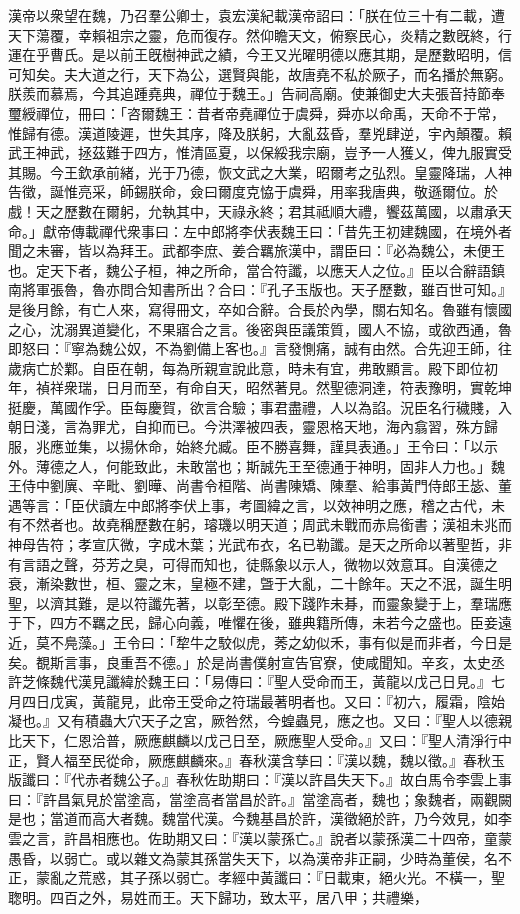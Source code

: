 \begin{pinyinscope}
漢帝以衆望在魏，乃召羣公卿士，袁宏漢紀載漢帝詔曰：「朕在位三十有二載，遭天下蕩覆，幸賴祖宗之靈，危而復存。然仰瞻天文，俯察民心，炎精之數旣終，行運在乎曹氏。是以前王旣樹神武之績，今王又光曜明德以應其期，是歷數昭明，信可知矣。夫大道之行，天下為公，選賢與能，故唐堯不私於厥子，而名播於無窮。朕羨而慕焉，今其追踵堯典，禪位于魏王。」告祠高廟。使兼御史大夫張音持節奉璽綬禪位，冊曰：「咨爾魏王：昔者帝堯禪位于虞舜，舜亦以命禹，天命不于常，惟歸有德。漢道陵遲，世失其序，降及朕躬，大亂茲昏，羣兇肆逆，宇內顛覆。賴武王神武，拯茲難于四方，惟清區夏，以保綏我宗廟，豈予一人獲乂，俾九服實受其賜。今王欽承前緒，光于乃德，恢文武之大業，昭爾考之弘烈。皇靈降瑞，人神告徵，誕惟亮采，師錫朕命，僉曰爾度克恊于虞舜，用率我唐典，敬遜爾位。於戲！天之歷數在爾躬，允執其中，天祿永終；君其祗順大禮，饗茲萬國，以肅承天命。」獻帝傳載禪代衆事曰：左中郎將李伏表魏王曰：「昔先王初建魏國，在境外者聞之未審，皆以為拜王。武都李庶、姜合羈旅漢中，謂臣曰：『必為魏公，未便王也。定天下者，魏公子桓，神之所命，當合符讖，以應天人之位。』臣以合辭語鎮南將軍張魯，魯亦問合知書所出？合曰：『孔子玉版也。天子歷數，雖百世可知。』是後月餘，有亡人來，寫得冊文，卒如合辭。合長於內學，關右知名。魯雖有懷國之心，沈溺異道變化，不果寤合之言。後密與臣議策質，國人不協，或欲西通，魯即怒曰：『寧為魏公奴，不為劉備上客也。』言發惻痛，誠有由然。合先迎王師，往歲病亡於鄴。自臣在朝，每為所親宣說此意，時未有宜，弗敢顯言。殿下即位初年，禎祥衆瑞，日月而至，有命自天，昭然著見。然聖德洞達，符表豫明，實乾坤挺慶，萬國作孚。臣每慶賀，欲言合驗；事君盡禮，人以為諂。況臣名行穢賤，入朝日淺，言為罪尤，自抑而已。今洪澤被四表，靈恩格天地，海內翕習，殊方歸服，兆應並集，以揚休命，始終允臧。臣不勝喜舞，謹具表通。」王令曰：「以示外。薄德之人，何能致此，未敢當也；斯誠先王至德通于神明，固非人力也。」魏王侍中劉廙、辛毗、劉曄、尚書令桓階、尚書陳矯、陳羣、給事黃門侍郎王毖、董遇等言：「臣伏讀左中郎將李伏上事，考圖緯之言，以效神明之應，稽之古代，未有不然者也。故堯稱歷數在躬，璿璣以明天道；周武未戰而赤烏銜書；漢祖未兆而神母告符；孝宣庂微，字成木葉；光武布衣，名已勒讖。是天之所命以著聖哲，非有言語之聲，芬芳之臭，可得而知也，徒縣象以示人，微物以效意耳。自漢德之衰，漸染數世，桓、靈之末，皇極不建，曁于大亂，二十餘年。天之不泯，誕生明聖，以濟其難，是以符讖先著，以彰至德。殿下踐阼未朞，而靈象變于上，羣瑞應于下，四方不羈之民，歸心向義，唯懼在後，雖典籍所傳，未若今之盛也。臣妾遠近，莫不鳧藻。」王令曰：「犂牛之駮似虎，莠之幼似禾，事有似是而非者，今日是矣。覩斯言事，良重吾不德。」於是尚書僕射宣告官寮，使咸聞知。辛亥，太史丞許芝條魏代漢見讖緯於魏王曰：「易傳曰：『聖人受命而王，黃龍以戊己日見。』七月四日戊寅，黃龍見，此帝王受命之符瑞最著明者也。又曰：『初六，履霜，陰始凝也。』又有積蟲大穴天子之宮，厥咎然，今蝗蟲見，應之也。又曰：『聖人以德親比天下，仁恩洽普，厥應麒麟以戊己日至，厥應聖人受命。』又曰：『聖人清淨行中正，賢人福至民從命，厥應麒麟來。』春秋漢含孳曰：『漢以魏，魏以徵。』春秋玉版讖曰：『代赤者魏公子。』春秋佐助期曰：『漢以許昌失天下。』故白馬令李雲上事曰：『許昌氣見於當塗高，當塗高者當昌於許。』當塗高者，魏也；象魏者，兩觀闕是也；當道而高大者魏。魏當代漢。今魏基昌於許，漢徵絕於許，乃今效見，如李雲之言，許昌相應也。佐助期又曰：『漢以蒙孫亡。』說者以蒙孫漢二十四帝，童蒙愚昏，以弱亡。或以雜文為蒙其孫當失天下，以為漢帝非正嗣，少時為董侯，名不正，蒙亂之荒惑，其子孫以弱亡。孝經中黃讖曰：『日載東，絕火光。不橫一，聖聦明。四百之外，易姓而王。天下歸功，致太平，居八甲；共禮樂，
\end{pinyinscope}
